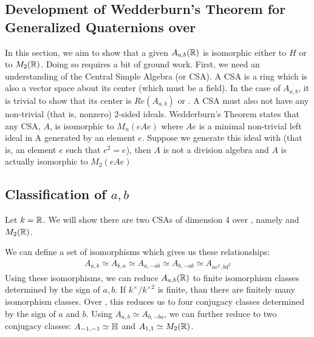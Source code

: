 \documentclass{article}
\begin{document}
\subsection{Development of Wedderburn's Theorem for Generalized Quaternions over \bR}
In this section, we aim to show that a given $A_{a,b}(\protect\mathbb{R})$  is isomorphic either to $H$ or to $M_2(\protect\mathbb{R})$. Doing so requires a bit of ground work. First, we need an understanding of the Central Simple Algebra (or CSA). A CSA is a ring which is also a vector space about its center (which must be a field). In the case of $A_{a,b}$, it is trivial to show that its center is $Re(A_{a,b})$ or \bR. A CSA must also not have any non-trivial (that is, nonzero) 2-sided ideals.
Wedderburn's Theorem states that any CSA, $A$, is isomorphic to $M_n(eAe)$ where $Ae$ is a minimal non-trivial left ideal in A generated by an element $e$. Suppose we generate this ideal with  (that is, an element $e$ such that $e^2=e$), then $A$ is not a division algebra and $A$ is actually isomorphic to $M_2(eAe)$


\subsection{Classification of $a,b$}
Let $k=\protect\mathbb{R}$. We will show there are two CSAs of dimension 4 over \bR, namely \bH and $M_2(\protect\mathbb{R})$. 

We can define a set of isomorphisms which gives us these relationships:
\begin{gather*}
    A_{a,b} \simeq A_{b,a} \simeq A_{a, -ab} \simeq A_{b,-ab} \simeq A_{ac^2, bd^2}
\end{gather*}
Using these isomorphisms, we can reduce $A_{a,b}(\protect\mathbb{R})$ to finite isomorphism classes determined by the sign of $a,b$. If $k^{\times}/k^{\times 2}$ is finite, than there are finitely many isomorphism classes. Over \bR, this reduces us to four conjugacy classes determined by the sign of $a$ and $b$. Using $A_{a,b} \simeq A_{b,-ba}$, we can further reduce to two conjugacy classes: $A_{-1, -1} \simeq \protect\mathbb{H}$ and $A_{1,1} \simeq M_2(\protect\mathbb{R})$. 
\end{document}
